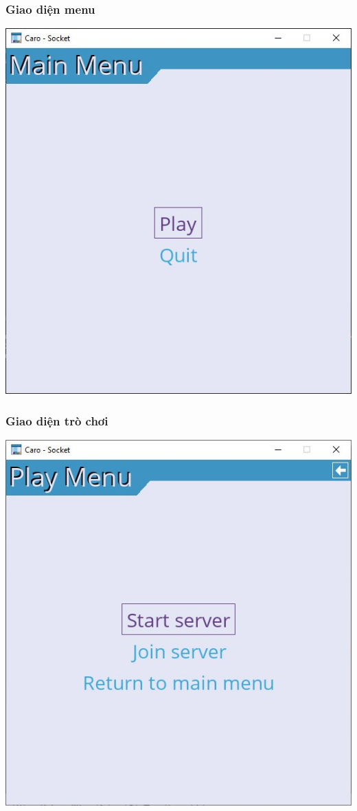 \documentclass[a4paper]{article}
\begin{document}
\subsubsection{Giao diện menu}
\includegraphics[width=14cm]{images/app/main_menu.png}

\subsubsection{Giao diện trò chơi}
\includegraphics[width=14cm]{images/app/play_menu.png}
\end{document}
